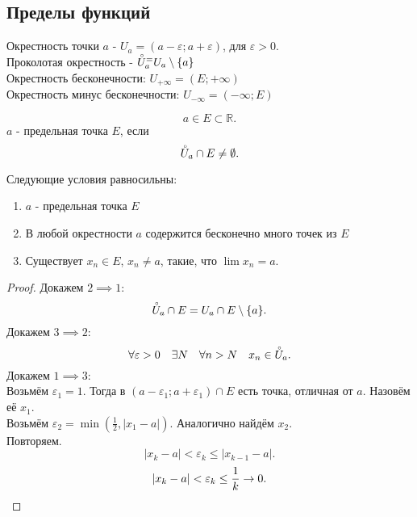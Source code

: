 \documentclass[11pt, oneside]{article}   	%
\begin{document}
    \subsection{Пределы функций}
        \begin{definition}
            Окрестность точки $a$ - $U_a = \left( a-\varepsilon; a+\varepsilon \right) $, для $\varepsilon > 0$.\\
            Проколотая окрестность - $\accentset{\circ}{U}_a^ = U_a \setminus \{a\} $ \\
            Окрестность бесконечности: $U_{+\infty} = \left( E; +\infty \right) $ \\
            Окрестность минус бесконечности: $U_{-\infty} = \left( -\infty; E \right) $
        \end{definition}
        \begin{definition}
            \[ a\in E \subset \mathbb{R} .\] 
            $a$ - предельная точка $E$, если
            \[ \accentset{\circ}{U}_a\cap E \neq \emptyset .\] 
        \end{definition}
        \begin{theorem}
            Следующие условия равносильны:\\
            \begin{enumerate}
                \item $a$ - предельная точка $E $
                \item В любой окрестности $a$ содержится бесконечно много точек из $E$ 
                \item Существует $x_n\in E$, $x_n \neq a$, такие, что $\lim x_n = a$.
            \end{enumerate}
            \begin{proof}
                Докажем $2 \implies 1$:
                \[ \accentset{\circ}{U}_a\cap E = U_a\cap E \setminus \{a\}  .\] 
                Докажем $3 \implies 2$:
                \[ \forall{\varepsilon>0}\quad \exists{N}\quad \forall{n>N}\quad x_n\in \accentset{\circ}{U}_a .\]
                Докажем $1 \implies 3$:\\
                Возьмём $\varepsilon_1 = 1$. Тогда в $\left( a-\varepsilon_1; a+\varepsilon_1 \right)\cap E$ есть точка, отличная от $a$. Назовём её  $x_1$.\\
                Возьмём $\varepsilon_2 = \min\left( \frac{1}{2}, |x_1-a| \right) $. Аналогично найдём $x_2$.\\
                Повторяем.
                \[ |x_k-a| < \varepsilon_k \le |x_{k-1}-a| .\]
                \[ |x_k-a| < \varepsilon_k \le \frac{1}{k} \to 0 .\qedhere\] 
            \end{proof}
        \end{theorem}
\end{document}
